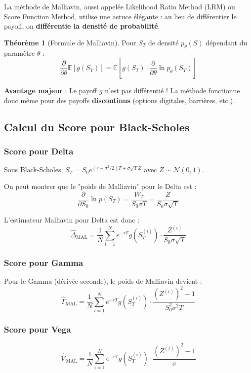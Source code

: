 \documentclass[a4paper,11pt]{article}
\theoremstyle{definition}
\newtheorem{theoreme}{Théorème}[section]
\begin{document}
La méthode de Malliavin, aussi appelée Likelihood Ratio Method (LRM) ou Score Function Method, utilise une astuce élégante : au lieu de différentier le payoff, on \textbf{différentie la densité de probabilité}.

\begin{theoreme}[Formule de Malliavin]
Pour $S_T$ de densité $p_\theta(S)$ dépendant du paramètre $\theta$ :
$$\frac{\partial}{\partial \theta} \mathbb{E}[g(S_T)] = \mathbb{E}\left[ g(S_T) \cdot \frac{\partial}{\partial \theta} \ln p_\theta(S_T) \right]$$
\end{theoreme}

\textbf{Avantage majeur} : Le payoff $g$ n'est pas différentié ! La méthode fonctionne donc même pour des payoffs \textbf{discontinus} (options digitales, barrières, etc.).

\subsection{Calcul du Score pour Black-Scholes}

\subsubsection{Score pour Delta}

Sous Black-Scholes, $S_T = S_0 e^{(r-\sigma^2/2)T + \sigma\sqrt{T} Z}$ avec $Z \sim \mathcal{N}(0,1)$.

On peut montrer que le "poids de Malliavin" pour le Delta est :
$$\frac{\partial}{\partial S_0} \ln p(S_T) = \frac{W_T}{S_0 \sigma T} = \frac{Z}{S_0 \sigma \sqrt{T}}$$

L'estimateur Malliavin pour Delta est donc :
$$\hat{\Delta}_{\text{MAL}} = \frac{1}{N} \sum_{i=1}^N e^{-rT} g(S_T^{(i)}) \cdot \frac{Z^{(i)}}{S_0 \sigma \sqrt{T}}$$

\subsubsection{Score pour Gamma}

Pour le Gamma (dérivée seconde), le poids de Malliavin devient :
$$\hat{\Gamma}_{\text{MAL}} = \frac{1}{N} \sum_{i=1}^N e^{-rT} g(S_T^{(i)}) \cdot \frac{(Z^{(i)})^2 - 1}{S_0^2 \sigma^2 T}$$

\subsubsection{Score pour Vega}

$$\hat{\mathcal{V}}_{\text{MAL}} = \frac{1}{N} \sum_{i=1}^N e^{-rT} g(S_T^{(i)}) \cdot \frac{(Z^{(i)})^2 - 1}{\sigma}$$
\end{document}

